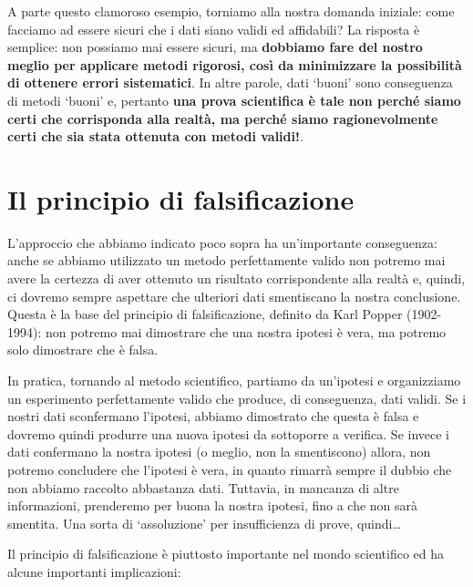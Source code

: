 \documentclass[a4paper,12pt,oneside]{book}
\begin{document}
A parte questo clamoroso esempio, torniamo alla nostra domanda iniziale: come facciamo ad essere sicuri che i dati siano validi ed affidabili? La risposta è semplice: non possiamo mai essere sicuri, ma \textbf{dobbiamo fare del nostro meglio per applicare metodi rigorosi, così da minimizzare la possibilità di ottenere errori sistematici}. In altre parole, dati `buoni' sono conseguenza di metodi `buoni' e, pertanto \textbf{una prova scientifica è tale non perché siamo certi che corrisponda alla realtà, ma perché siamo ragionevolmente certi che sia stata ottenuta con metodi validi!}.

\hypertarget{il-principio-di-falsificazione}{%
\section{Il principio di falsificazione}\label{il-principio-di-falsificazione}}

L'approccio che abbiamo indicato poco sopra ha un'importante conseguenza: anche se abbiamo utilizzato un metodo perfettamente valido non potremo mai avere la certezza di aver ottenuto un risultato corrispondente alla realtà e, quindi, ci dovremo sempre aspettare che ulteriori dati smentiscano la nostra conclusione. Questa è la base del principio di falsificazione, definito da Karl Popper (1902-1994): non potremo mai dimostrare che una nostra ipotesi è vera, ma potremo solo dimostrare che è falsa.

In pratica, tornando al metodo scientifico, partiamo da un'ipotesi e organizziamo un esperimento perfettamente valido che produce, di conseguenza, dati validi. Se i nostri dati sconfermano l'ipotesi, abbiamo dimostrato che questa è falsa e dovremo quindi produrre una nuova ipotesi da sottoporre a verifica. Se invece i dati confermano la nostra ipotesi (o meglio, non la smentiscono) allora, non potremo concludere che l'ipotesi è vera, in quanto rimarrà sempre il dubbio che non abbiamo raccolto abbastanza dati. Tuttavia, in mancanza di altre informazioni, prenderemo per buona la nostra ipotesi, fino a che non sarà smentita. Una sorta di `assoluzione' per insufficienza di prove, quindi\ldots{}

Il principio di falsificazione è piuttosto importante nel mondo scientifico ed ha alcune importanti implicazioni:
\end{document}
